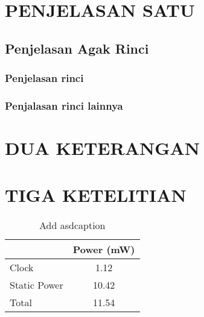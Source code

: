 \section{PENJELASAN SATU}
\blindtext[2]


\blindtext[5]
 

\blindtext[1]

\subsection{Penjelasan Agak Rinci}
\blindtext[2]
\subsubsection{Penjelasan rinci}
\blindtext[1]
\subsubsection{Penjalasan rinci lainnya}
\blindtext[3]

\section{DUA KETERANGAN}
\blindtext[3]

\section{TIGA KETELITIAN}
\blindtext[3]

\begin{table}
	\centering
	\caption{Add asdcaption}
	\begin{tabular}{|l|c|}
		\hline
		\rowcolor[rgb]{ .906,  .902,  .902} \multicolumn{1}{|c|}{Unprotected} & Power (mW) \bigstrut\\
		\hline
		Clock & 1.12 \bigstrut\\
		\hline
		Static Power & 10.42 \bigstrut\\
		\hline
		Total & 11.54 \bigstrut\\
		\hline
	\end{tabular}%
	\label{tab:addlaabel}%
\end{table}%

\blindtext[5]